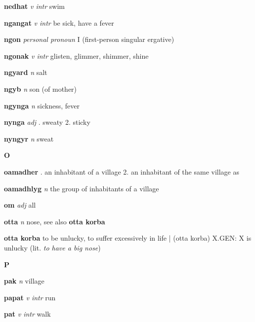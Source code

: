 \textbf{nedhat}   \emph{v intr} \textperiodcentered swim

\textbf{ngangat}   \emph{v intr} \textperiodcentered be sick, have a fever

\textbf{ngon}   \emph{personal pronoun} \textperiodcentered I (first-person singular ergative)

\textbf{ngonak}   \emph{v intr} \textperiodcentered glisten, glimmer, shimmer, shine

\textbf{ngyard}   \emph{n} \textperiodcentered salt

\textbf{ngyb}   \emph{n} \textperiodcentered son (of mother)

\textbf{ngynga}   \emph{n} \textperiodcentered sickness, fever

\textbf{nynga}   \emph{adj} . sweaty 2. sticky 

\textbf{nyngyr}   \emph{n} \textperiodcentered sweat

\begin{center} \Huge \bfseries O \end{center}\textbf{oamadher}    . an inhabitant of a village 2. an inhabitant of the same village as \GEN 

\textbf{oamadhlyg}   \emph{n} \textperiodcentered the group of inhabitants of a village

\textbf{om}   \emph{adj} \textperiodcentered all

\textbf{otta}   \emph{n} \textperiodcentered nose, see also \textbf{otta korba}

\textbf{otta korba}    \textperiodcentered to be unlucky, to suffer excessively in life | (otta korba) X.GEN: X is unlucky (lit. \emph{to have a big nose})

\begin{center} \Huge \bfseries P \end{center}\textbf{pak}   \emph{n} \textperiodcentered village

\textbf{papat}   \emph{v intr} \textperiodcentered run

\textbf{pat}   \emph{v intr} \textperiodcentered walk

